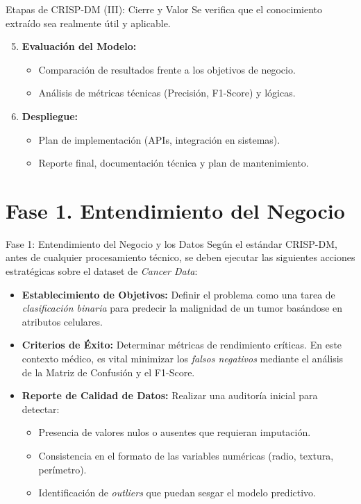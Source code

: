 \documentclass{beamer}
\begin{document}
	\begin{frame}{Etapas de CRISP-DM (III): Cierre y Valor}
		Se verifica que el conocimiento extraído sea realmente útil y aplicable.
		\begin{enumerate}
			\setcounter{enumi}{4}
			\item \textbf{Evaluación del Modelo:}
			\begin{itemize}
				\item Comparación de resultados frente a los objetivos de negocio.
				\item Análisis de métricas técnicas (Precisión, F1-Score) y lógicas.
			\end{itemize}
			\item<2-> \textbf{Despliegue:}
			\begin{itemize}
				\item Plan de implementación (APIs, integración en sistemas).
				\item Reporte final, documentación técnica y plan de mantenimiento.
			\end{itemize}
		\end{enumerate}
	\end{frame}
	
	\section{Fase 1. Entendimiento del Negocio}
	\begin{frame}{Fase 1: Entendimiento del Negocio y los Datos}
		Según el estándar CRISP-DM, antes de cualquier procesamiento técnico, se deben ejecutar las siguientes acciones estratégicas sobre el dataset de \textit{Cancer Data}:
		
		\begin{itemize}
			\item<2-> \textbf{Establecimiento de Objetivos:} Definir el problema como una tarea de \textit{clasificación binaria} para predecir la malignidad de un tumor basándose en atributos celulares.
			\item<3-> \textbf{Criterios de Éxito:} Determinar métricas de rendimiento críticas. En este contexto médico, es vital minimizar los \textit{falsos negativos} mediante el análisis de la Matriz de Confusión y el F1-Score.
			\item<4-> \textbf{Reporte de Calidad de Datos:} Realizar una auditoría inicial para detectar:
			\begin{itemize}
				\item Presencia de valores nulos o ausentes que requieran imputación.
				\item Consistencia en el formato de las variables numéricas (radio, textura, perímetro).
				\item Identificación de \textit{outliers} que puedan sesgar el modelo predictivo.
			\end{itemize}
		\end{itemize}
	\end{frame}
	
\end{document}
